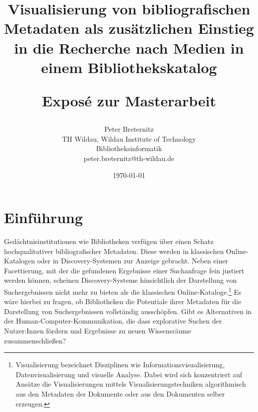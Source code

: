\documentclass[10pt,a4paper,twocolumn,conference]{IEEEtran}
\begin{document}
\nocite{*}
\title{{\bf Visualisierung von bibliografischen Metadaten als zusätzlichen Einstieg in die
        Recherche nach Medien in einem Bibliothekskatalog} \\ 
    \begin{large}
        Exposé zur Masterarbeit                                                                             
    \end{large}}
\author{
	Peter Breternitz \\
	TH Wildau, Wildau Institute of Technology\\ Bibliotheksinformatik \\
	peter.breternitz@th-wildau.de
}


\date{\today}

\maketitle

\section{Einführung}
Gedächtnisinstitutionen wie Bibliotheken verfügen über einen Schatz 
hochqualitativer bibliografischer Metadaten. Diese werden in klassischen 
Online-Katalogen oder in Discovery-Systemen zur Anzeige gebracht. 
Neben einer Facettierung, mit der die gefundenen Ergebnisse einer Suchanfrage fein justiert werden 
können, scheinen Discovery-Systeme hinsichtlich der Darstellung von Suchergebnissen 
nicht mehr zu bieten als die klassischen Online-Kataloge.\footnote{Visualisierung bezeichnet Disziplinen
wie Informationsvisualisierung, Datenvisualisierung und visuelle Analyse. Dabei wird sich konzentriert 
auf Ansätze die Visualisierungen mittels Visualisierungstechniken algorithmisch aus den Metadaten
der Dokumente oder aus den Dokumenten selber erzeugen.} 
Es wäre hierbei zu fragen, ob Bibliotheken die Potentiale ihrer Metadaten für die Darstellung von Suchergebnissen 
vollständig ausschöpfen. Gibt es Alternativen in der Human-Computer-Kommunikation, die dass explorative Suchen 
der Nutzer:Innen fördern und Ergebnisse zu neuen Wissensräume zusammenschließen?
\end{document}
